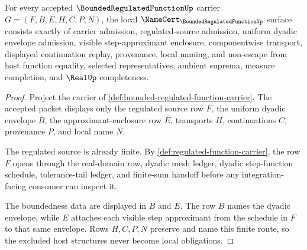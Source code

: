 \begin{theorem}
\label{thm:bounded-regulated-function-namecert-obligations}
For every accepted $\BoundedRegulatedFunctionUp$ carrier $G=(F,B,E,H,C,P,N)$, the local $\NameCert_{\BoundedRegulatedFunctionUp}$ surface consists exactly of carrier admission, regulated-source admission, uniform dyadic envelope admission, visible step-approximant enclosure, componentwise transport, displayed continuation replay, provenance, local naming, and non-escape from host function equality, selected representatives, ambient suprema, measure completion, and $\RealUp$ completeness.
\end{theorem}
\begin{proof}
Project the carrier of \autoref{def:bounded-regulated-function-carrier}. The accepted packet displays only the regulated source row $F$, the uniform dyadic envelope $B$, the approximant-enclosure row $E$, transports $H$, continuations $C$, provenance $P$, and local name $N$.

The regulated source is already finite. By \autoref{def:regulated-function-carrier}, the row $F$ opens through the real-domain row, dyadic mesh ledger, dyadic step-function schedule, tolerance-tail ledger, and finite-sum handoff before any integration-facing consumer can inspect it.

The boundedness data are displayed in $B$ and $E$. The row $B$ names the dyadic envelope, while $E$ attaches each visible step approximant from the schedule in $F$ to that same envelope. Rows $H,C,P,N$ preserve and name this finite route, so the excluded host structures never become local obligations.
\end{proof}

